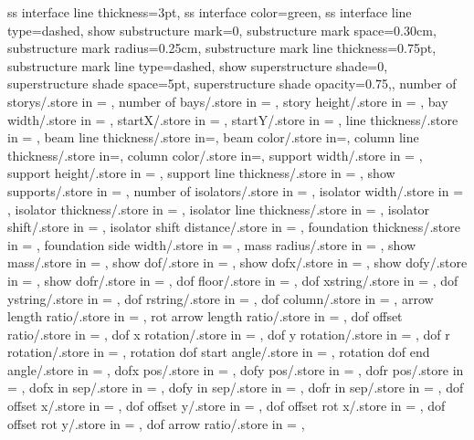 {{  ss interface line thickness=3pt,
  ss interface color=green,
  ss interface line type=dashed,
  show substructure mark=0,
  substructure mark space=0.30cm,
  substructure mark radius=0.25cm,
  substructure mark line thickness=0.75pt,
  substructure mark line type=dashed,
  show superstructure shade=0,
  superstructure shade space=5pt,
  superstructure shade opacity=0.75,},
  number of storys/.store in = \storynumber,
  number of bays/.store in = \baynumber,
  story height/.store in = \storyheight,
  bay width/.store in = \baywidth,
  startX/.store in = \startx,
  startY/.store in = \starty,
  line thickness/.store in = \linet,
  beam line thickness/.store in=\beamlinet,
  beam color/.store in=\beamcolor,
  column line thickness/.store in=\collinet,
  column color/.store in=\columncolor,
  support width/.store in = \supportwidth,
  support height/.store in = \supportheight,
  support line thickness/.store in = \baselinet,
  show supports/.store in = \showsupports,
  number of isolators/.store in = \numberofisolators,
  isolator width/.store in = \isolationwidth,
  isolator thickness/.store in = \isolationdepth,
  isolator line thickness/.store in = \isolinet,
  isolator shift/.store in = \isoshiftyn,
  isolator shift distance/.store in = \isoshift,
  foundation thickness/.store in = \foundationdepth,
  foundation side width/.store in = \foundsidew,
  mass radius/.store in = \massrad,
  show mass/.store in = \showmass,
  show dof/.store in = \showdof,
  show dofx/.store in = \shodofx,
  show dofy/.store in = \shodofy,
  show dofr/.store in = \shodofr,
  dof floor/.store in = \doflocfloor,
  dof xstring/.store in = \dofxstr,
  dof ystring/.store in = \dofystr,
  dof rstring/.store in = \dofrstr,
  dof column/.store in = \dofloccolumn,
  arrow length ratio/.store in = \arrowlenratio,
  rot arrow length ratio/.store in = \rotarrowlenratio,
  dof offset ratio/.store in = \dofoffsetratio,
  dof x rotation/.store in = \dofxrotation,
  dof y rotation/.store in = \dofyrotation,
  dof r rotation/.store in = \dofrrotation,
  rotation dof start angle/.store in = \rotdofstartangle,
  rotation dof end angle/.store in = \rotdofendangle,
  dofx pos/.store in = \dofposx,
  dofy pos/.store in = \dofposy,
  dofr pos/.store in = \dofposr,
  dofx in sep/.store in = \dofinnersepx,
  dofy in sep/.store in = \dofinnersepy,
  dofr in sep/.store in = \dofinnersepr,
  dof offset x/.store in = \dofoffsetx,
  dof offset y/.store in = \dofoffsety,
  dof offset rot x/.store in = \dofrotoffsetx,  
  dof offset rot y/.store in = \dofrotoffsety,
  dof arrow ratio/.store in = \dofarrowratio,
}
